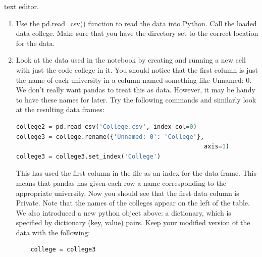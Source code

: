 \begin{exercise}[2.8]
	 text editor.
	\begin{enumerate}[label=(\alph*)]
		\item  Use the pd.read\_csv() function to read the data into Python. Call
		the loaded data college. Make sure that you have the directory
		set to the correct location for the data.
		\item Look at the data used in the notebook by creating and running
		a new cell with just the code college in it. You should notice
		that the first column is just the name of each university in a
		column named something like Unnamed: 0. We don’t really want
		pandas to treat this as data. However, it may be handy to have
		these names for later. Try the following commands and similarly
		look at the resulting data frames:
		\begin{lstlisting}[language=Python]
college2 = pd.read_csv('College.csv', index_col=0)
college3 = college.rename({'Unnamed: 0': 'College'},
													axis=1)
college3 = college3.set_index('College')
	\end{lstlisting}		
This has used the first column in the file as an index for the
data frame. This means that pandas has given each row a name
corresponding to the appropriate university. Now you should see
that the first data column is Private. Note that the names of
the colleges appear on the left of the table. We also introduced
a new python object above: a dictionary, which is specified by dictionary
(key, value) pairs. Keep your modified version of the data with
the following:
\begin{lstlisting}
	college = college3
\end{lstlisting}


\end{enumerate}
\end{exercise}
